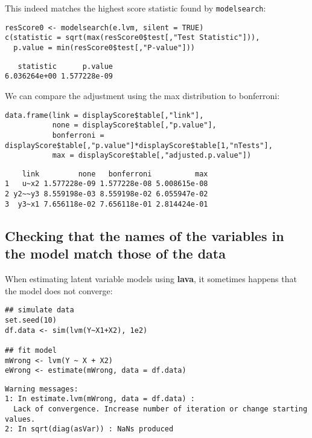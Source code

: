 \documentclass[12pt]{article}
\begin{document}
This indeed matches the highest score statistic found by
\texttt{modelsearch}:
\lstset{language=r,label= ,caption= ,captionpos=b,numbers=none}
\begin{lstlisting}
resScore0 <- modelsearch(e.lvm, silent = TRUE)
c(statistic = sqrt(max(resScore0$test[,"Test Statistic"])), 
  p.value = min(resScore0$test[,"P-value"]))
\end{lstlisting}

\begin{verbatim}
   statistic      p.value 
6.036264e+00 1.577228e-09
\end{verbatim}

We can compare the adjustment using the max distribution to bonferroni:
\lstset{language=r,label= ,caption= ,captionpos=b,numbers=none}
\begin{lstlisting}
data.frame(link = displayScore$table[,"link"],
		   none = displayScore$table[,"p.value"],
		   bonferroni = displayScore$table[,"p.value"]*displayScore$table[1,"nTests"],
		   max = displayScore$table[,"adjusted.p.value"])
\end{lstlisting}

\begin{verbatim}
    link         none   bonferroni          max
1   u~x2 1.577228e-09 1.577228e-08 5.008615e-08
2 y2~~y3 8.559198e-03 8.559198e-02 6.055947e-02
3  y3~x1 7.656118e-02 7.656118e-01 2.814424e-01
\end{verbatim}

\subsection{Checking that the names of the variables in the model match those of the data}
\label{sec:org01de8d5}

When estimating latent variable models using \textbf{lava}, it sometimes
happens that the model does not converge:
\lstset{language=r,label= ,caption= ,captionpos=b,numbers=none}
\begin{lstlisting}
## simulate data
set.seed(10)
df.data <- sim(lvm(Y~X1+X2), 1e2)

## fit model
mWrong <- lvm(Y ~ X + X2)
eWrong <- estimate(mWrong, data = df.data)
\end{lstlisting}

\begin{verbatim}
Warning messages:
1: In estimate.lvm(mWrong, data = df.data) :
  Lack of convergence. Increase number of iteration or change starting values.
2: In sqrt(diag(asVar)) : NaNs produced
\end{verbatim}
\end{document}
